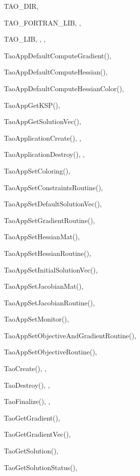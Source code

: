 \begin{theindex}
  \item TAO\_DIR, 
  \item TAO\_FORTRAN\_LIB, , 
  \item TAO\_LIB, , , 
  \item TaoAppDefaultComputeGradient(), 
  \item TaoAppDefaultComputeHessian(), 
  \item TaoAppDefaultComputeHessianColor(), 
  \item TaoAppGetKSP(), 
  \item TaoAppGetSolutionVec(), 
  \item TaoApplicationCreate(), , 
  \item TaoApplicationDestroy(), , 
  \item TaoAppSetColoring(), 
  \item TaoAppSetConstraintsRoutine(), 
  \item TaoAppSetDefaultSolutionVec(), 
  \item TaoAppSetGradientRoutine(), 
  \item TaoAppSetHessianMat(), 
  \item TaoAppSetHessianRoutine(), 
  \item TaoAppSetInitialSolutionVec(), 
  \item TaoAppSetJacobianMat(), 
  \item TaoAppSetJacobianRoutine(), 
  \item TaoAppSetMonitor(), 
  \item TaoAppSetObjectiveAndGradientRoutine(), 
  \item TaoAppSetObjectiveRoutine(), 
  \item TaoCreate(), , 
  \item TaoDestroy(), , 
  \item TaoFinalize(), , 
  \item TaoGetGradient(), 
  \item TaoGetGradientVec(), 
  \item TaoGetSolution(), 
  \item TaoGetSolutionStatus(), 

\end{theindex}
